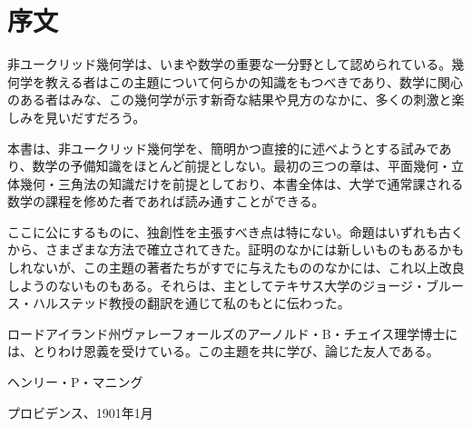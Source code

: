 \chapter{序文}

非ユークリッド幾何学は、いまや数学の重要な一分野として認められている。幾何学を教える者はこの主題について何らかの知識をもつべきであり、数学に関心のある者はみな、この幾何学が示す新奇な結果や見方のなかに、多くの刺激と楽しみを見いだすだろう。

本書は、非ユークリッド幾何学を、簡明かつ直接的に述べようとする試みであり、数学の予備知識をほとんど前提としない。最初の三つの章は、平面幾何・立体幾何・三角法の知識だけを前提としており、本書全体は、大学で通常課される数学の課程を修めた者であれば読み通すことができる。

ここに公にするものに、独創性を主張すべき点は特にない。命題はいずれも古くから、さまざまな方法で確立されてきた。証明のなかには新しいものもあるかもしれないが、この主題の著者たちがすでに与えたもののなかには、これ以上改良しようのないものもある。それらは、主としてテキサス大学のジョージ・ブルース・ハルステッド教授の翻訳を通じて私のもとに伝わった。

ロードアイランド州ヴァレーフォールズのアーノルド・B・チェイス理学博士には、とりわけ恩義を受けている。この主題を共に学び、論じた友人である。

\bigskip
\begin{flushright}
ヘンリー・P・マニング

\small プロビデンス、1901年1月
\end{flushright}
